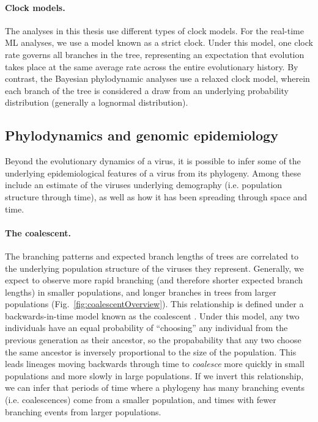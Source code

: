\paragraph*{Clock models.}
The analyses in this thesis use different types of clock models.
For the real-time ML analyses, we use a model known as a strict clock.
Under this model, one clock rate governs all branches in the tree, representing an expectation that evolution takes place at the same average rate across the entire evolutionary history.
By contrast, the Bayesian phylodynamic analyses use a relaxed clock model, wherein each branch of the tree is considered a draw from an underlying probability distribution (generally a lognormal distribution).

\subsection{Phylodynamics and genomic epidemiology}\label{ssec:phylodynamics}
Beyond the evolutionary dynamics of a virus, it is possible to infer some of the underlying epidemiological features of a virus from its phylogeny.
Among these include an estimate of the viruses underlying demography (i.e. population structure through time), as well as how it has been spreading through space and time.

\paragraph*{The coalescent.}
The branching patterns and expected branch lengths of trees are correlated to the underlying population structure of the viruses they represent.
Generally, we expect to observe more rapid branching (and therefore shorter expected branch lengths) in smaller populations, and longer branches in trees from larger populations (Fig.~\ref{fig:coalescentOverview}).
This relationship is defined under a backwards-in-time model known as the coalescent \citep{kingman1982coalescent,kingman1982genealogy}.
Under this model, any two individuals have an equal probability of ``choosing'' any individual from the previous generation as their ancestor, so the propabability that any two choose the same ancestor is inversely proportional to the size of the population.
This leads lineages moving backwards through time to \textit{coalesce} more quickly in small populations and more slowly in large populations.
If we invert this relationship, we can infer that periods of time where a phylogeny has many branching events (i.e. coalescences) come from a smaller population, and times with fewer branching events from larger populations.

